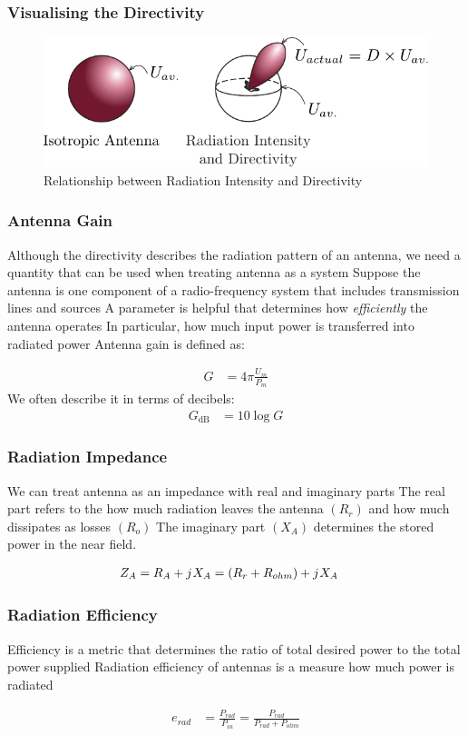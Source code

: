 \documentclass[10pt, compress]{beamer}
\renewcommand{\j}{{j}\mkern1mu} %
\begin{document}
\begin{frame}
  \frametitle{Visualising the Directivity}
  \begin{figure}
    \centering
    \includegraphics[width=.8\textwidth]{src/antenna_dir.pdf}
    \caption{Relationship between Radiation Intensity and Directivity}
  \end{figure}
\end{frame}


\begin{frame}
  \frametitle{Antenna Gain}
  \begin{outline}
    \1 Although the directivity describes the radiation pattern of an antenna, we need a quantity that can be used when treating antenna as a system
    \1 Suppose the antenna is one component of a radio-frequency system that includes transmission lines and sources
    \1 A parameter is helpful that determines how \textit{efficiently} the antenna operates
    \2 In particular, how much input power is transferred into radiated power
    \1 Antenna gain is defined as:
  \end{outline}
  \begin{align*}
    G & = 4 \pi \frac{U_m}{P_m}
  \end{align*}
  We often describe it in terms of decibels:
  \begin{align*}
    G_{\mathrm{dB}} & = 10 \log G
  \end{align*}
\end{frame}

\begin{frame}
  \frametitle{Radiation Impedance}
  \begin{outline}
    \1 We can treat antenna as an impedance with real and imaginary parts
    \2 The real part refers to the how much radiation leaves the antenna $(R_r)$ and how much dissipates as losses $(R_o)$
    \2 The imaginary part $(X_A)$ determines the stored power in the near field.
  \end{outline}
  \begin{align*}
    Z_A & = R_A + \j X_A = (R_r + R_{ohm}) + \j X_A
  \end{align*}
\end{frame}

\begin{frame}
  \frametitle{Radiation Efficiency}
  \begin{outline}
    \1 Efficiency is a metric that determines the ratio of total desired power to the total power supplied
    \1 Radiation efficiency of antennas is a measure how much power is radiated
  \end{outline}
  \begin{align*}
    e_{rad} & = \frac{P_{rad}}{P_{in}} = \frac{P_{rad}}{P_{rad} + P_{ohm}}
  \end{align*}
\end{frame}
\end{document}
